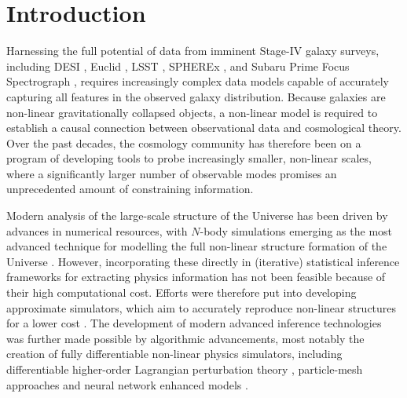 \section{Introduction}
Harnessing the full potential of data from imminent Stage-IV galaxy surveys, including DESI \citep{DESICollaboration2016}, Euclid \citep{Laureijs2011,Amendola2018}, LSST \citep{LSSTScienceCollaboration2009,LSSTDarkEnergyScienceCollaboration2012,Ivezic2019}, SPHEREx \citep{Dore2014,Dore2018}, and Subaru Prime Focus Spectrograph \citep{Takada2012}, requires increasingly complex data models capable of accurately capturing all features in the observed galaxy distribution. Because galaxies are non-linear gravitationally collapsed objects, a non-linear model is required to establish a causal connection between observational data and cosmological theory. Over the past decades, the cosmology community has therefore been on a program of developing tools to probe increasingly smaller, non-linear scales, where a significantly larger number of observable modes promises an unprecedented amount of constraining information. 

Modern analysis of the large-scale structure of the Universe has been driven by advances in numerical resources, with $N$-body simulations emerging as the most advanced technique for modelling the full non-linear structure formation of the Universe \citep[see reviews by][]{Vogelsberger2020,Angulo2021}. However, incorporating these directly in (iterative) statistical inference frameworks for extracting physics information has not been feasible because of their high computational cost. Efforts were therefore put into developing approximate simulators, which aim to accurately reproduce non-linear structures for a lower cost \citep[see e.g][]{1995A&A...296..575B,Tassev2013,Leclercq2015,Feng2016,Rampf2024}. The development of modern advanced inference technologies was further made possible by algorithmic advancements, most notably the creation of fully differentiable non-linear physics simulators, including differentiable higher-order Lagrangian perturbation theory \citep{Jasche2012}, particle-mesh approaches \citep{Dai2018,Jasche2019,Modi2021,Ll2022} and neural network enhanced models \citep{He2019,AlvesDeOliveira,Bernardini2020,Kaushal,Jamieson2022b, Jamieson2024, Doeser2024, Bartlett2024}.

